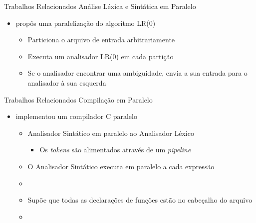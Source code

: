 \begin{frame}{Trabalhos Relacionados}
    Análise Léxica e Sintática em Paralelo
    \begin{itemize}
        \item \cite{Mickunas:1978:PCM:800127.804105} propôs uma paralelização do algoritmo LR(0)
            \begin{itemize}
                \item Particiona o arquivo de entrada arbitrariamente
                \item Executa um analisador LR(0) em cada partição
                \item Se o analisador encontrar uma ambiguidade, envia a sua entrada para o analisador à sua esquerda
            \end{itemize}
    \end{itemize}
\end{frame}

\begin{frame}{Trabalhos Relacionados}
    Compilação em Paralelo
    \begin{itemize}
        \item \cite{vandevoorde1988parallel} implementou um compilador C paralelo
            \begin{itemize}
                \item Analisador Sintático em paralelo ao Analisador Léxico
                    \begin{itemize}
                        \item Os \textit{tokens} são alimentados através de um \textit{pipeline}
                    \end{itemize}
                \item O Analisador Sintático executa em paralelo a cada expressão
                \item[]
                \item Supõe que todas as declarações de funções estão no cabeçalho do arquivo
                \item {\color{red}{Não discute otimização}}
            \end{itemize}
    \end{itemize}
\end{frame}


